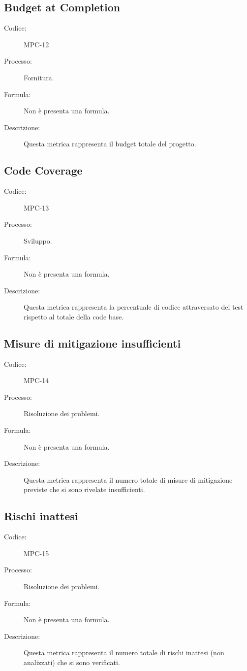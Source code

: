 \subsection{Budget at Completion}
\begin{description}
    \item[Codice:] MPC-12
    \item[Processo:] Fornitura.
    \item[Formula:] Non è presenta una formula.
    \item[Descrizione:] Questa metrica rappresenta il budget totale del progetto.
\end{description}

\subsection{Code Coverage}
\begin{description}
    \item[Codice:] MPC-13
    \item[Processo:] Sviluppo.
    \item[Formula:] Non è presenta una formula.
    \item[Descrizione:] Questa metrica rappresenta la percentuale di codice attraversato dei test rispetto al totale della code base.
\end{description}

\subsection{Misure di mitigazione insufficienti}
\begin{description}
    \item[Codice:] MPC-14
    \item[Processo:] Risoluzione dei problemi.
    \item[Formula:] Non è presenta una formula.
    \item[Descrizione:] Questa metrica rappresenta il numero totale di misure di mitigazione previste che si sono rivelate insufficienti.
\end{description}

\subsection{Rischi inattesi}
\begin{description}
    \item[Codice:] MPC-15
    \item[Processo:] Risoluzione dei problemi.
    \item[Formula:] Non è presenta una formula.
    \item[Descrizione:] Questa metrica rappresenta il numero totale di rischi inattesi (non analizzati) che si sono verificati.
\end{description}

